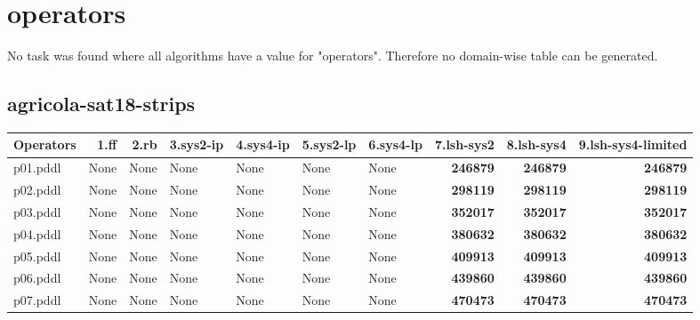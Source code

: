 \documentclass{article}
\begin{document}
\section*{operators}

No task was found where all algorithms have a value for "operators". Therefore no domain-wise table can be generated.

\hypertarget{operators-agricola-sat18-strips}{}
\subsection*{agricola-sat18-strips}

\begin{tabular}{@{}lrrrrrrrrr@{}}
Operators & 1.ff & 2.rb & 3.sys2-ip & 4.sys4-ip & 5.sys2-lp & 6.sys4-lp & 7.lsh-sys2 & 8.lsh-sys4 & 9.lsh-sys4-limited \\
\midrule
p01.pddl & \multicolumn{1}{|l|}{None} & \multicolumn{1}{|l|}{None} & \multicolumn{1}{|l|}{None} & \multicolumn{1}{|l|}{None} & \multicolumn{1}{|l|}{None} & \multicolumn{1}{|l|}{None} & \textbf{246879} & \textbf{246879} & \textbf{246879} \\
p02.pddl & \multicolumn{1}{|l|}{None} & \multicolumn{1}{|l|}{None} & \multicolumn{1}{|l|}{None} & \multicolumn{1}{|l|}{None} & \multicolumn{1}{|l|}{None} & \multicolumn{1}{|l|}{None} & \textbf{298119} & \textbf{298119} & \textbf{298119} \\
p03.pddl & \multicolumn{1}{|l|}{None} & \multicolumn{1}{|l|}{None} & \multicolumn{1}{|l|}{None} & \multicolumn{1}{|l|}{None} & \multicolumn{1}{|l|}{None} & \multicolumn{1}{|l|}{None} & \textbf{352017} & \textbf{352017} & \textbf{352017} \\
p04.pddl & \multicolumn{1}{|l|}{None} & \multicolumn{1}{|l|}{None} & \multicolumn{1}{|l|}{None} & \multicolumn{1}{|l|}{None} & \multicolumn{1}{|l|}{None} & \multicolumn{1}{|l|}{None} & \textbf{380632} & \textbf{380632} & \textbf{380632} \\
p05.pddl & \multicolumn{1}{|l|}{None} & \multicolumn{1}{|l|}{None} & \multicolumn{1}{|l|}{None} & \multicolumn{1}{|l|}{None} & \multicolumn{1}{|l|}{None} & \multicolumn{1}{|l|}{None} & \textbf{409913} & \textbf{409913} & \textbf{409913} \\
p06.pddl & \multicolumn{1}{|l|}{None} & \multicolumn{1}{|l|}{None} & \multicolumn{1}{|l|}{None} & \multicolumn{1}{|l|}{None} & \multicolumn{1}{|l|}{None} & \multicolumn{1}{|l|}{None} & \textbf{439860} & \textbf{439860} & \textbf{439860} \\
p07.pddl & \multicolumn{1}{|l|}{None} & \multicolumn{1}{|l|}{None} & \multicolumn{1}{|l|}{None} & \multicolumn{1}{|l|}{None} & \multicolumn{1}{|l|}{None} & \multicolumn{1}{|l|}{None} & \textbf{470473} & \textbf{470473} & \textbf{470473} \\

\end{tabular}
\end{document}
